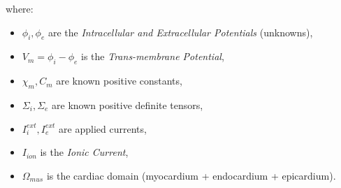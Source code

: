 \documentclass[a4paper,11pt]{article}
\begin{document}
	where:
	\begin{itemize}[label=\textendash]
		\item $\phi_i, \phi_e$ are the \emph{Intracellular and Extracellular Potentials} (unknowns),
		\item $V_m = \phi_i-\phi_e$ is the \emph{Trans-membrane Potential},
		\item $\chi_m,C_m$ are known positive constants,
		\item $\Sigma_i, \Sigma_e$ are known positive definite tensors,
		\item $I_i^{ext},I_e^{ext}$ are applied currents,
		\item $I_{ion}$ is the \emph{Ionic Current},
		\item $\Omega_{mus}$ is the cardiac domain (myocardium + endocardium + epicardium).
	\end{itemize}
    
\end{document}

